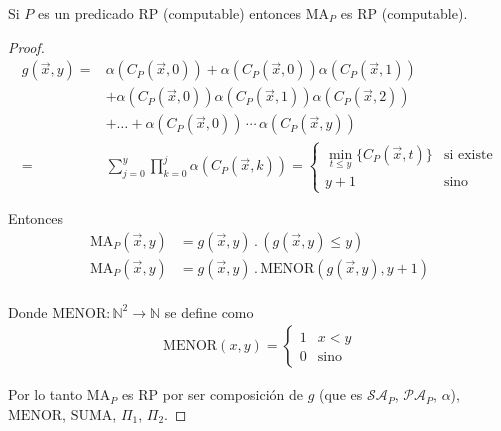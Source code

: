 \begin{teorema}{}{}
    Si $P$ es un predicado RP (computable) 
    entonces $\mathrm{MA}_P$ es RP (computable).
\end{teorema}

\begin{proof} \phantom{.}

    \begin{align*}
        g(\overrightarrow{x},y) =& \alpha(C_P(\overrightarrow{x},0)) 
        + \alpha(C_P(\overrightarrow{x}, 0)) \alpha(C_P(\overrightarrow{x},1))
        \\
        &+ \alpha(C_P(\overrightarrow{x},0)) \alpha(C_P(\overrightarrow{x},1))
          \alpha(C_P(\overrightarrow{x},2)) \\
        &+ \dots
        + \alpha(C_P(\overrightarrow{x},0)) \, \cdots \, 
          \alpha(C_P(\overrightarrow{x},y)) \\
        =& \sum_{j=0}^{y} \prod_{k=0}^{j} \alpha(C_P(\overrightarrow{x},k))
        = \begin{cases}
            \min_{t \leq y}{\{ C_P (\overrightarrow{x},t) \}} & \text{si 
            existe} \\
            y+1 & \text{sino}
        \end{cases}
    \end{align*}

    Entonces
    \begin{align*}
        \mathrm{MA}_P (\overrightarrow{x},y) 
        &= g(\overrightarrow{x},y) \, . \, (g(\overrightarrow{x},y) \leq y) \\
        \mathrm{MA}_P (\overrightarrow{x},y) 
        &= g(\overrightarrow{x},y) \, . \, \mathrm{MENOR}(g(\overrightarrow{x},y) , y+1) \\
    \end{align*}

    Donde $\mathrm{MENOR}: \mathbb{N}^2 \to \mathbb{N}$ se define como
    \begin{gather*}
        \mathrm{MENOR} (x,y) =
        \begin{cases}
            1 & x < y \\
            0 & \text{sino}
        \end{cases}
    \end{gather*}

    Por lo tanto $\mathrm{MA}_P$ es RP por ser composición de $g$ (que es $\mathcal{SA}_P$, $\mathcal{PA}_P$,
    $\alpha$), $\mathrm{MENOR}$, $\mathrm{SUMA}$, $\Pi_1$, $\Pi_2$.
\end{proof}

